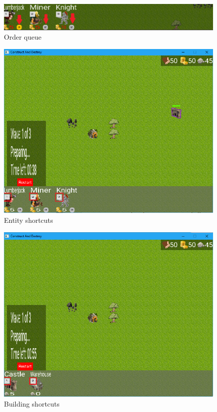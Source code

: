 \begin{figure}
    \centering
    \includegraphics[scale=0.7]{res/unit-panel-order-queue.png}
    \caption{Order queue}\label{fig:unit-panel-order-queue}
\end{figure}

\begin{figure}
    \centering
    \includegraphics[scale=0.6]{res/entity-shortcuts.png}
    \caption{Entity shortcuts}\label{fig:entity-shortcuts}
\end{figure}

\begin{figure}
    \centering
    \includegraphics[scale=0.6]{res/building-shortcuts.png}
    \caption{Building shortcuts}\label{fig:building-shortcuts}
\end{figure}

